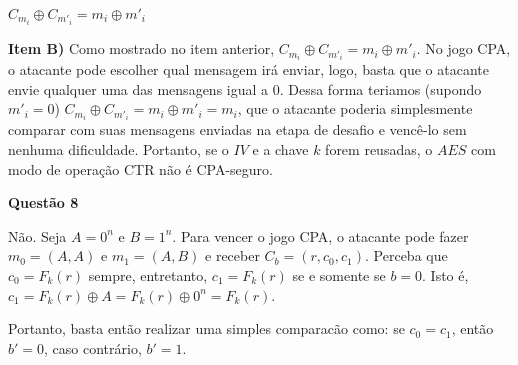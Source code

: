 \documentclass{article}
\begin{document}
    $C_{m_i} \oplus C_{m'_i} = m_i \oplus m'_i$

\textbf{Item B)}
    Como mostrado no item anterior, $C_{m_i} \oplus C_{m'_i} = m_i \oplus m'_i$. No jogo CPA, o atacante pode escolher qual mensagem irá enviar, logo, basta que o atacante envie qualquer uma das mensagens igual a 0. Dessa forma teriamos (supondo $m'_i = 0$) $C_{m_i} \oplus C_{m'_i} = m_i \oplus m'_i = m_i$, que o atacante poderia simplesmente comparar com suas mensagens enviadas na etapa de desafio e vencê-lo sem nenhuma dificuldade. Portanto, se o $IV$ e a chave $k$ forem reusadas, o $AES$ com modo de operação CTR não é CPA-seguro.

\textbf{Questão 8}

    Não. Seja $A = 0^n$ e $B = 1^n$. Para vencer o jogo CPA, o atacante pode fazer $m_0 = (A,A)$ e $m_1 = (A,B)$ e receber $C_b = (r, c_0, c_1)$. Perceba que $c_0 = F_k(r)$ sempre, entretanto, $c_1 = F_k(r)$ se e somente se $b = 0$. Isto é, $c_1 = F_k(r) \oplus A = F_k(r) \oplus 0^n = F_k(r)$.
    
    Portanto, basta então realizar uma simples comparacão como: se $c_0 = c_1$, então $b' = 0$, caso contrário, $b' = 1$.
\end{document}
